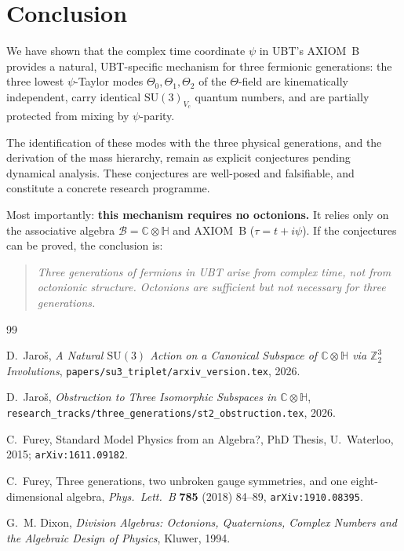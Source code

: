 \documentclass[12pt,a4paper]{article}
\theoremstyle{remark}
\begin{document}
\section{Conclusion}
\label{sec:conclusion}

We have shown that the complex time coordinate $\psi$ in UBT's AXIOM~B
provides a natural, UBT-specific mechanism for three fermionic generations:
the three lowest $\psi$-Taylor modes $\Theta_0, \Theta_1, \Theta_2$ of the
$\Theta$-field are kinematically independent, carry identical
$\mathrm{SU}(3)_{V_c}$ quantum numbers, and are partially protected from
mixing by $\psi$-parity.

The identification of these modes with the three physical generations, and the
derivation of the mass hierarchy, remain as explicit conjectures pending
dynamical analysis.  These conjectures are well-posed and falsifiable, and
constitute a concrete research programme.

Most importantly: \textbf{this mechanism requires no octonions.}  It relies
only on the associative algebra $\mathcal{B} = \mathbb{C}\otimes\mathbb{H}$
and AXIOM~B ($\tau = t + i\psi$).  If the conjectures can be proved, the
conclusion is:

\begin{quote}
  \emph{Three generations of fermions in UBT arise from complex time, not from
  octonionic structure.  Octonions are sufficient but not necessary for three
  generations.}
\end{quote}

\begin{thebibliography}{99}

D.~Jaro\v{s},
\emph{A Natural $\mathrm{SU}(3)$ Action on a Canonical Subspace of
$\mathbb{C}\otimes\mathbb{H}$ via $\mathbb{Z}_2^3$ Involutions},
\texttt{papers/su3\_triplet/arxiv\_version.tex}, 2026.

D.~Jaro\v{s},
\emph{Obstruction to Three Isomorphic Subspaces in $\mathbb{C}\otimes\mathbb{H}$},
\texttt{research\_tracks/three\_generations/st2\_obstruction.tex}, 2026.

C.~Furey,
Standard Model Physics from an Algebra?,
PhD Thesis, U.~Waterloo, 2015; \texttt{arXiv:1611.09182}.

C.~Furey,
Three generations, two unbroken gauge symmetries, and one eight-dimensional
algebra, \emph{Phys.\ Lett.\ B} \textbf{785} (2018) 84--89,
\texttt{arXiv:1910.08395}.

G.~M. Dixon,
\emph{Division Algebras: Octonions, Quaternions, Complex Numbers and the
Algebraic Design of Physics}, Kluwer, 1994.

\end{thebibliography}
\end{document}
